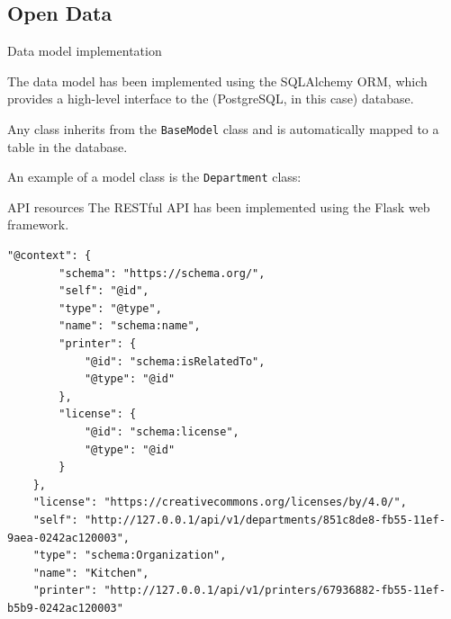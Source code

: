 \subsection[Open Data]{Open Data}

\begin{frame}[allowframebreaks]{Data model implementation}

	The data model has been implemented using the SQLAlchemy ORM, which
	provides a high-level interface to the (PostgreSQL, in this case) database.

	

	Any class inherits from the \texttt{BaseModel} class and is automatically
	mapped to a table in the database.

	\framebreak

	An example of a model class is the \texttt{Department} class:

	
	\vspace*{-.25\baselineskip}
\end{frame}

\newenvironment{slide}[1][]
{%
  \begin{frame}[allowframebreaks,#1]%
  }{%
  \end{frame}%
}

\begin{frame}{API resources}
	The RESTful API has been implemented using the Flask web framework.

	

	\framebreak

	\begin{lstlisting}[style=JSONStyle,caption={\texttt{GET /api/v1/departments} response}]
	"@context": {
		"schema": "https://schema.org/",
		"self": "@id",
		"type": "@type",
		"name": "schema:name",
		"printer": {
			"@id": "schema:isRelatedTo",
			"@type": "@id"
		},
		"license": {
			"@id": "schema:license",
			"@type": "@id"
		}
	},
	"license": "https://creativecommons.org/licenses/by/4.0/",
	"self": "http://127.0.0.1/api/v1/departments/851c8de8-fb55-11ef-9aea-0242ac120003",
	"type": "schema:Organization",
	"name": "Kitchen",
	"printer": "http://127.0.0.1/api/v1/printers/67936882-fb55-11ef-b5b9-0242ac120003"\end{lstlisting}
\end{frame}

